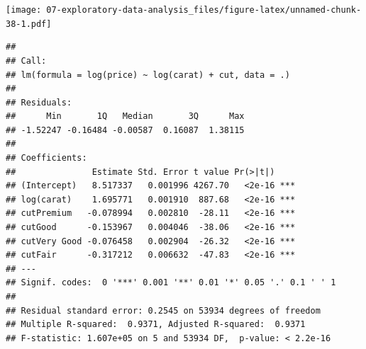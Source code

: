 \documentclass[]{book}
\newenvironment{Shaded}{\begin{snugshade}}{\end{snugshade}}
\newcommand{\CommentTok}[1]{\textcolor[rgb]{0.56,0.35,0.01}{\textit{#1}}}
\newcommand{\DataTypeTok}[1]{\textcolor[rgb]{0.13,0.29,0.53}{#1}}
\newcommand{\KeywordTok}[1]{\textcolor[rgb]{0.13,0.29,0.53}{\textbf{#1}}}
\newcommand{\NormalTok}[1]{#1}
\newcommand{\OperatorTok}[1]{\textcolor[rgb]{0.81,0.36,0.00}{\textbf{#1}}}
\newcommand{\StringTok}[1]{\textcolor[rgb]{0.31,0.60,0.02}{#1}}
\theoremstyle{definition}
\theoremstyle{definition}
\theoremstyle{definition}
\theoremstyle{remark}
\begin{document}
\texttt{[image: 07-exploratory-data-analysis\_files/figure-latex/unnamed-chunk-38-1.pdf]}

\begin{Shaded}
\end{Shaded}

\begin{verbatim}
## 
## Call:
## lm(formula = log(price) ~ log(carat) + cut, data = .)
## 
## Residuals:
##      Min       1Q   Median       3Q      Max 
## -1.52247 -0.16484 -0.00587  0.16087  1.38115 
## 
## Coefficients:
##               Estimate Std. Error t value Pr(>|t|)    
## (Intercept)   8.517337   0.001996 4267.70   <2e-16 ***
## log(carat)    1.695771   0.001910  887.68   <2e-16 ***
## cutPremium   -0.078994   0.002810  -28.11   <2e-16 ***
## cutGood      -0.153967   0.004046  -38.06   <2e-16 ***
## cutVery Good -0.076458   0.002904  -26.32   <2e-16 ***
## cutFair      -0.317212   0.006632  -47.83   <2e-16 ***
## ---
## Signif. codes:  0 '***' 0.001 '**' 0.01 '*' 0.05 '.' 0.1 ' ' 1
## 
## Residual standard error: 0.2545 on 53934 degrees of freedom
## Multiple R-squared:  0.9371, Adjusted R-squared:  0.9371 
## F-statistic: 1.607e+05 on 5 and 53934 DF,  p-value: < 2.2e-16
\end{verbatim}

\begin{Shaded}
\end{Shaded}
\end{document}
